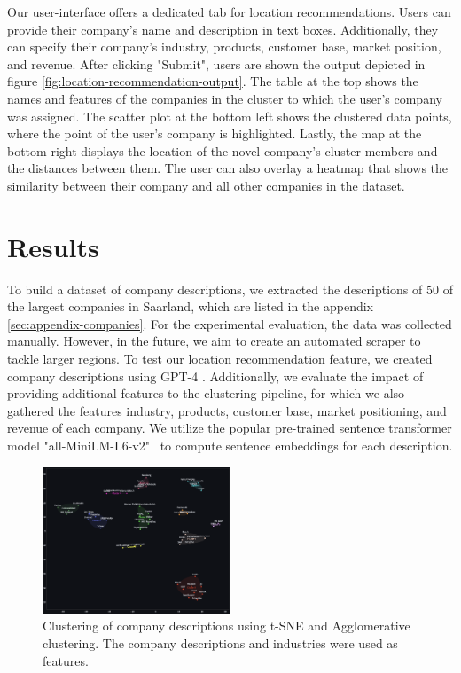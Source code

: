 \documentclass[12pt]{article}
\begin{document}
   Our user-interface offers a dedicated tab for location recommendations. Users can provide their company's name and description in text boxes. Additionally, they can specify their company's industry, products, customer base, market position, and revenue. After clicking "Submit", users are shown the output depicted in figure \ref{fig:location-recommendation-output}. The table at the top shows the names and features of the companies in the cluster to which the user's company was assigned. The scatter plot at the bottom left shows the clustered data points, where the point of the user's company is highlighted. Lastly, the map at the bottom right displays the location of the novel company's cluster members and the distances between them. The user can also overlay a heatmap that shows the similarity between their company and all other companies in the dataset.
   
   \section*{Results}
   To build a dataset of company descriptions, we extracted the descriptions of $50$ of the largest companies in Saarland, which are listed in the appendix \ref{sec:appendix-companies}.
   For the experimental evaluation, the data was collected manually. However, in the future, we aim to create an automated scraper to tackle larger regions. To test our location recommendation feature, we created company descriptions using GPT-4 \cite{chatgpt}.
   Additionally, we evaluate the impact of providing additional features to the clustering pipeline, for which we also gathered the features industry, products, customer base, market positioning, and revenue of each company. 
   We utilize the popular pre-trained sentence transformer model "all-MiniLM-L6-v2"~\cite{sentence-transformer-model} to compute sentence embeddings for each description.  
   
   \begin{figure}[H]
   	\centering
   	\includegraphics[width=0.5\textwidth]{figures/clustering_results.png}
   	\caption{Clustering of company descriptions using t-SNE and Agglomerative clustering. The company descriptions and industries were used as features.}
   	\label{fig:t-sne-agglomerative}
   \end{figure}
   
\end{document}
